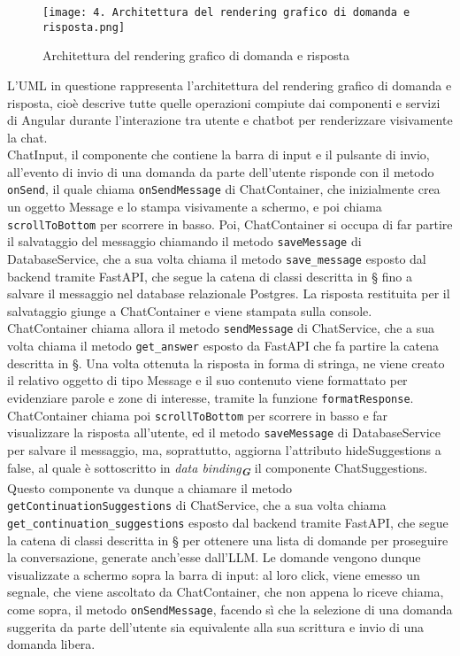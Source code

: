 \begin{figure}[h]
    \centering
    \texttt{[image: 4. Architettura del rendering grafico di domanda e risposta.png]}
    \caption{Architettura del rendering grafico di domanda e risposta}
\end{figure}

L'UML in questione rappresenta l'architettura del rendering grafico di domanda e risposta, cioè descrive tutte quelle operazioni compiute dai componenti e servizi di Angular durante l'interazione tra utente e chatbot per renderizzare visivamente la chat.\\
ChatInput, il componente che contiene la barra di input e il pulsante di invio, all'evento di invio di una domanda da parte dell'utente risponde con il metodo \texttt{onSend}, il quale chiama \texttt{onSendMessage} di ChatContainer, che inizialmente crea un oggetto Message e lo stampa visivamente a schermo, e poi chiama \texttt{scrollToBottom} per scorrere in basso. Poi, ChatContainer si occupa di far partire il salvataggio del messaggio chiamando il metodo \texttt{saveMessage} di DatabaseService, che a sua volta chiama il metodo \texttt{save\_message} esposto dal backend tramite FastAPI, che segue la catena di classi descritta in \S{} fino a salvare il messaggio nel database relazionale Postgres. La risposta restituita per il salvataggio giunge a ChatContainer e viene stampata sulla console. ChatContainer chiama allora il metodo \texttt{sendMessage} di ChatService, che a sua volta chiama il metodo \texttt{get\_answer} esposto da FastAPI che fa partire la catena descritta in \S{}. Una volta ottenuta la risposta in forma di stringa, ne viene creato il relativo oggetto di tipo Message e il suo contenuto viene formattato per evidenziare parole e zone di interesse, tramite la funzione \texttt{formatResponse}. ChatContainer chiama poi \texttt{scrollToBottom} per scorrere in basso e far visualizzare la risposta all'utente, ed il metodo \texttt{saveMessage} di DatabaseService per salvare il messaggio, ma, soprattutto, aggiorna l'attributo hideSuggestions a false, al quale è sottoscritto in \emph{data binding}\textsubscript{\textbf{\textit{G}}} il componente ChatSuggestions. Questo componente va dunque a chiamare il metodo \texttt{getContinuationSuggestions} di ChatService, che a sua volta chiama \texttt{get\_continuation\_suggestions} esposto dal backend tramite FastAPI, che segue la catena di classi descritta in \S{} per ottenere una lista di domande per proseguire la conversazione, generate anch'esse dall'LLM. Le domande vengono dunque visualizzate a schermo sopra la barra di input: al loro click, viene emesso un segnale, che viene ascoltato da ChatContainer, che non appena lo riceve chiama, come sopra, il metodo \texttt{onSendMessage}, facendo sì che la selezione di una domanda suggerita da parte dell'utente sia equivalente alla sua scrittura e invio di una domanda libera.


